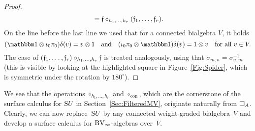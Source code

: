 \documentclass[\MainFolder/Text.tex]{subfiles}
\begin{document}
\begin{proof}
\begin{align*}
&\quad=\mathfrak{f}\circ_{h_1, \dotsc, h_r}(\mathfrak{f}_1, \dotsc, \mathfrak{f}_r).
\end{align*}
On the line before the last line we used that for a connected bialgebra $V$, it holds
$$ (\Id\otimes\iota_0\pi_0)\MVCoProd(v)=v\otimes 1\quad\text{and}\quad (\iota_0\pi_0\otimes\Id)\MVCoProd(v) = 1 \otimes v\quad\text{for all }v\in V.$$
The case of $(\mathfrak{f}_{1},\dotsc,\mathfrak{f}_r)\circ_{h_1,\dotsc,h_r}\mathfrak{f}$ is treated analogously, using that $\sigma_{m,n} = \sigma_{n,m}^{-1}$ (this is visible by looking at the highlighted square in Figure~\ref{Fig:Spider}, which is symmetric under the rotation by $180^\circ$).
\end{proof}

We see that the operations $\circ_{h_1,\dotsc,h_r}$ and $\circ_{\mathrm{con}}$, which are the cornerstone of the surface calculus for $\mathrm{S} U$ in Section~\ref{Sec:FilteredMV}, originate naturally from $\SquareComp_A$. Clearly, we can now replace~$\mathrm{S} U$ by any connected weight-graded bialgebra~$V$ and develop a surface calculus for $\mathrm{BV}_\infty$-algebras over~$V$.
\end{document}
